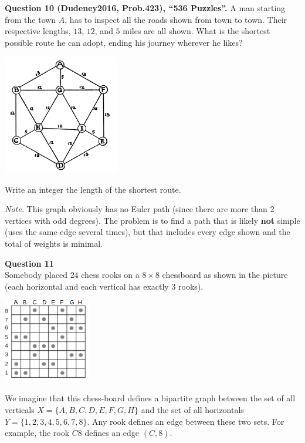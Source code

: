 \documentclass[jou]{apa6}
\begin{document}
\vspace{10pt}
{\bf Question 10 (Dudeney2016, Prob.423), ``536 Puzzles''.}
A man starting from the town $A$, has to inspect all the roads
shown from town to town. Their respective lengths, $13$, $12$, and $5$
miles are all shown. What is the shortest possible route he can adopt, 
ending his journey wherever he likes?
\begin{center}
\includegraphics[width=2in]{path-with-repetitions.png}
\end{center}

Write an integer \textendash{} the length of the shortest route.

{\em Note.} This graph obviously has no Euler path (since there
are more than $2$ vertices with odd degrees). The problem is to 
find a path that is likely {\bf not} simple 
(uses the same edge several times), 
but that includes every edge shown and the total of weights is minimal. 





\vspace{10pt}
{\bf Question 11}\\
Somebody placed $24$ chess rooks on a $8 \times 8$ chessboard as shown in the picture 
(each horizontal and each vertical has exactly $3$ rooks). 
\begin{center}
\includegraphics[width=1.5in]{quiz11/rooks.png}
\end{center}
We imagine that this chess-board defines a bipartite graph between the  
set of all verticals $X= \{ A,B,C,D,E,F,G,H \}$ and the set of all 
horizontals $Y= \{ 1,2,3,4,5,6,7,8 \}$. Any rook defines an edge between these two sets. 
For example, the rook $C8$ defines an edge $(C,8)$. 
\end{document}
